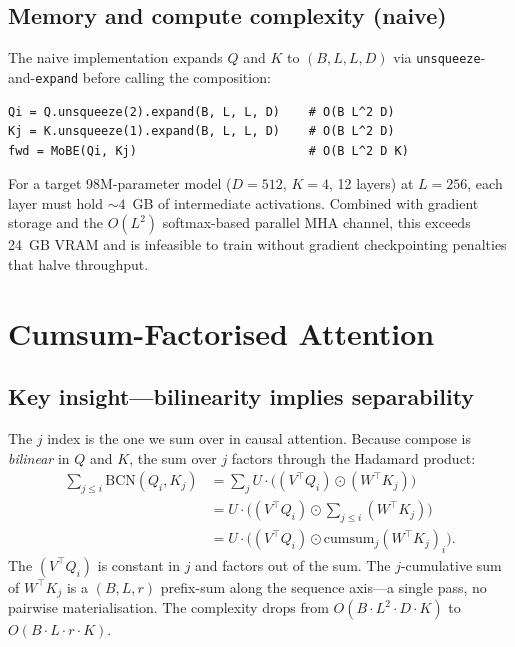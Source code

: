 \documentclass[11pt]{article}
\begin{document}
\subsection{Memory and compute complexity (naive)}

The naive implementation expands $Q$ and $K$ to $(B, L, L, D)$ via
\texttt{unsqueeze}-and-\texttt{expand} before calling the composition:

\begin{lstlisting}
Qi = Q.unsqueeze(2).expand(B, L, L, D)    # O(B L^2 D)
Kj = K.unsqueeze(1).expand(B, L, L, D)    # O(B L^2 D)
fwd = MoBE(Qi, Kj)                        # O(B L^2 D K)
\end{lstlisting}

For a target 98M-parameter model ($D = 512$, $K = 4$, 12 layers) at $L = 256$,
each layer must hold $\sim\!4$~GB of intermediate activations. Combined
with gradient storage and the $O(L^2)$ softmax-based parallel MHA channel,
this exceeds 24~GB VRAM and is infeasible to train without gradient
checkpointing penalties that halve throughput.

\section{Cumsum-Factorised Attention}
\label{sec:cumsum}

\subsection{Key insight---bilinearity implies separability}

The $j$ index is the one we sum over in causal attention. Because
compose is \emph{bilinear} in $Q$ and $K$, the sum over $j$ factors
through the Hadamard product:
\begin{align}
\sum_{j \leq i} \text{BCN}(Q_i, K_j)
&= \sum_{j} U \cdot \bigl((V^\top Q_i) \odot (W^\top K_j)\bigr) \nonumber\\
&= U \cdot \bigl((V^\top Q_i) \odot \textstyle\sum_{j \leq i} (W^\top K_j)\bigr) \nonumber\\
&= U \cdot \bigl((V^\top Q_i) \odot \mathrm{cumsum}_j(W^\top K_j)_i\bigr).
\label{eq:factorization}
\end{align}
The $(V^\top Q_i)$ is constant in $j$ and factors out of the sum. The
$j$-cumulative sum of $W^\top K_j$ is a $(B, L, r)$ prefix-sum along the
sequence axis---a single pass, no pairwise materialisation. The
complexity drops from $O(B \cdot L^2 \cdot D \cdot K)$ to
$O(B \cdot L \cdot r \cdot K)$.
\end{document}
